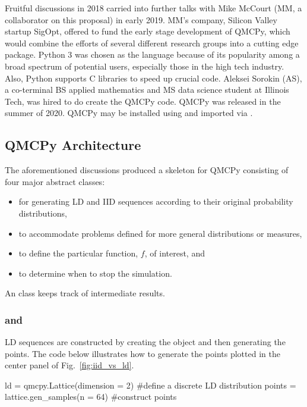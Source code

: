 \documentclass[11pt]{NSFamsart}
\begin{document}
Fruitful discussions in 2018 carried into further talks with Mike McCourt (MM, a collaborator on this proposal) in early 2019.  MM's company, Silicon Valley startup SigOpt, offered to fund the early stage development of  QMCPy, which would combine the efforts of several different research groups into a cutting edge package. Python 3 was chosen as the language because of its popularity among a broad spectrum of potential users, especially those in the high tech industry.  Also, Python supports C libraries to speed up crucial code.  Aleksei Sorokin (AS),  a co-terminal BS applied mathematics and MS data science student at Illinois Tech, was hired to do create the QMCPy code.  QMCPy was released in the summer of 2020.  QMCPy may be installed using  and imported via .




\subsection{QMCPy Architecture}

The aforementioned discussions produced a skeleton for QMCPy consisting of four major abstract classes:
\begin{itemize}
	\item {} for generating LD and IID sequences according to their original probability distributions,
	\item {} to accommodate problems defined for more general distributions or measures,
	\item {} to define the particular function, $f$, of interest, and
	\item {} to determine when to stop the simulation.
\end{itemize}
An  class keeps track of intermediate results.

\subsubsection{\textup{ and }} LD sequences are constructed by creating the object and then generating the points.  The code below illustrates how to generate the points plotted in the center panel of Fig.\ \ref{fig:iid_vs_ld}.
\begin{pythoncode}
ld = qmcpy.Lattice(dimension = 2)  #define a discrete LD distribution 
points = lattice.gen_samples(n = 64)  #construct points
\end{pythoncode}
\end{document}
